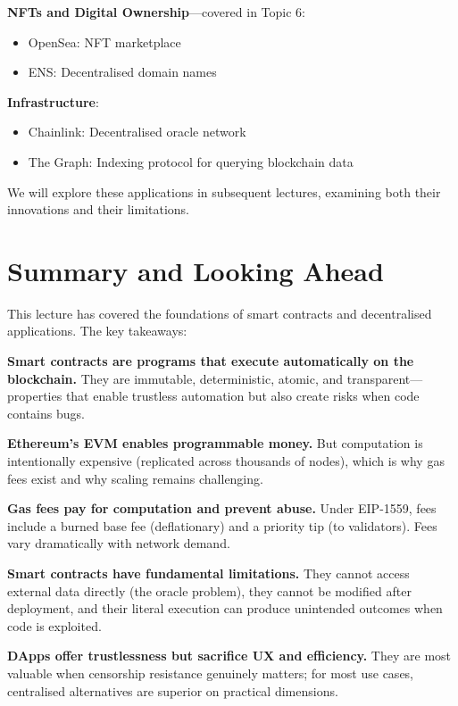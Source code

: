 \documentclass[11pt,a4paper]{article}
\begin{document}
\textbf{NFTs and Digital Ownership}---covered in Topic 6:
\begin{itemize}
    \item OpenSea: NFT marketplace
    \item ENS: Decentralised domain names
\end{itemize}

\textbf{Infrastructure}:
\begin{itemize}
    \item Chainlink: Decentralised oracle network
    \item The Graph: Indexing protocol for querying blockchain data
\end{itemize}

We will explore these applications in subsequent lectures, examining both their innovations and their limitations.

\section{Summary and Looking Ahead}

This lecture has covered the foundations of smart contracts and decentralised applications. The key takeaways:

\textbf{Smart contracts are programs that execute automatically on the blockchain.} They are immutable, deterministic, atomic, and transparent---properties that enable trustless automation but also create risks when code contains bugs.

\textbf{Ethereum's EVM enables programmable money.} But computation is intentionally expensive (replicated across thousands of nodes), which is why gas fees exist and why scaling remains challenging.

\textbf{Gas fees pay for computation and prevent abuse.} Under EIP-1559, fees include a burned base fee (deflationary) and a priority tip (to validators). Fees vary dramatically with network demand.

\textbf{Smart contracts have fundamental limitations.} They cannot access external data directly (the oracle problem), they cannot be modified after deployment, and their literal execution can produce unintended outcomes when code is exploited.

\textbf{DApps offer trustlessness but sacrifice UX and efficiency.} They are most valuable when censorship resistance genuinely matters; for most use cases, centralised alternatives are superior on practical dimensions.
\end{document}
